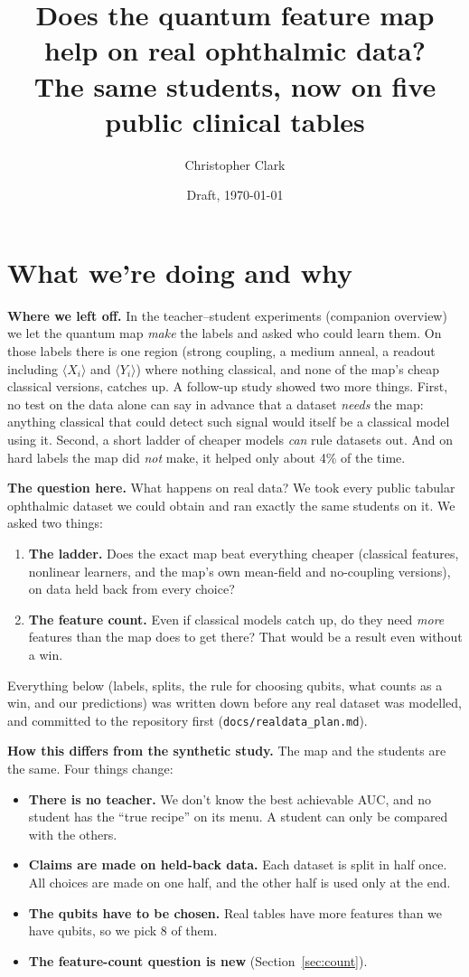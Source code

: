 \documentclass[11pt]{article}
\title{\bfseries Does the quantum feature map help on real ophthalmic data?\\[0.3em]
\large The same students, now on five public clinical tables}
\author{Christopher Clark}
\date{Draft, \today}
\begin{document}
\maketitle

\section{What we're doing and why}

\textbf{Where we left off.} In the teacher--student experiments (companion overview) we let the quantum map
\emph{make} the labels and asked who could learn them. On those labels there is one region (strong coupling,
a medium anneal, a readout including $\langle X_i\rangle$ and $\langle Y_i\rangle$) where nothing classical,
and none of the map's cheap classical versions, catches up. A follow-up study showed two more things. First,
no test on the data alone can say in advance that a dataset \emph{needs} the map: anything classical that
could detect such signal would itself be a classical model using it. Second, a short ladder of cheaper models
\emph{can} rule datasets out. And on hard labels the map did \emph{not} make, it helped only about 4\% of the
time.

\textbf{The question here.} What happens on real data? We took every public tabular ophthalmic dataset we
could obtain and ran exactly the same students on it. We asked two things:
\begin{enumerate}\setlength{\itemsep}{2pt}
\item \textbf{The ladder.} Does the exact map beat everything cheaper (classical features, nonlinear
learners, and the map's own mean-field and no-coupling versions), on data held back from every choice?
\item \textbf{The feature count.} Even if classical models catch up, do they need \emph{more} features than
the map does to get there? That would be a result even without a win.
\end{enumerate}
Everything below (labels, splits, the rule for choosing qubits, what counts as a win, and our predictions) was
written down before any real dataset was modelled, and committed to the repository first
(\texttt{docs/realdata\_plan.md}).

\textbf{How this differs from the synthetic study.} The map and the students are the same. Four things change:
\begin{itemize}\setlength{\itemsep}{2pt}
\item \textbf{There is no teacher.} We don't know the best achievable AUC, and no student has the ``true
recipe'' on its menu. A student can only be compared with the others.
\item \textbf{Claims are made on held-back data.} Each dataset is split in half once. All choices are made on
one half, and the other half is used only at the end.
\item \textbf{The qubits have to be chosen.} Real tables have more features than we have qubits, so we pick
8 of them.
\item \textbf{The feature-count question is new} (Section~\ref{sec:count}).
\end{itemize}
\end{document}
